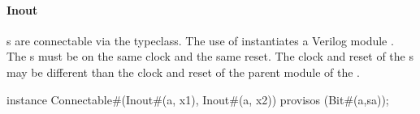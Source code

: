 \paragraph{Inout} s are connectable via the  typeclass. The
  use of  instantiates a Verilog module .  The s must be on the same clock
and  the same reset.  The clock and reset of the
s may be different than the clock and reset of the parent
module of the . 
\begin{libverbatim}
instance Connectable#(Inout#(a, x1), Inout#(a, x2))
   provisos (Bit#(a,sa));
\end{libverbatim}



